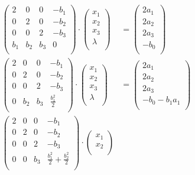 \documentclass[letterpaper]{article}
\renewcommand{\*}{\cdot}
\theoremstyle{definition}
\begin{document}
\begin{align*}
	\begin{pmatrix}
	2 & 0 & 0 & -b_1 \\
	0 & 2 & 0 & -b_2 \\
	0 & 0 & 2 & -b_3 \\
	b_1 & b_2 & b_3 & 0 \\
	\end{pmatrix} \* \begin{pmatrix}
	x_1\\
	x_2\\
	x_3\\
	\lambda\\
	\end{pmatrix} &= \begin{pmatrix}
	2a_1\\
	2a_2\\
	2a_3\\
	-b_0\\
	\end{pmatrix}\\
	\begin{pmatrix}
	2 & 0 & 0 & -b_1 \\
	0 & 2 & 0 & -b_2 \\
	0 & 0 & 2 & -b_3 \\
	0 & b_2 & b_3 & \frac{b_1^2}{2} \\
	\end{pmatrix} \* \begin{pmatrix}
	x_1\\
	x_2\\
	x_3\\
	\lambda\\
	\end{pmatrix} &= \begin{pmatrix}
	2a_1\\
	2a_2\\
	2a_3\\
	-b_0 - b_1a_1\\
	\end{pmatrix}\\ %
	\begin{pmatrix}
	2 & 0 & 0 & -b_1 \\
	0 & 2 & 0 & -b_2 \\
	0 & 0 & 2 & -b_3 \\
	0 & 0 & b_3 & \frac{b_1^2}{2} + \frac{b_2^2}{2} \\
	\end{pmatrix} \* \begin{pmatrix}
	x_1\\
	x_2\\

\end{pmatrix}
\end{align*}
\end{document}

